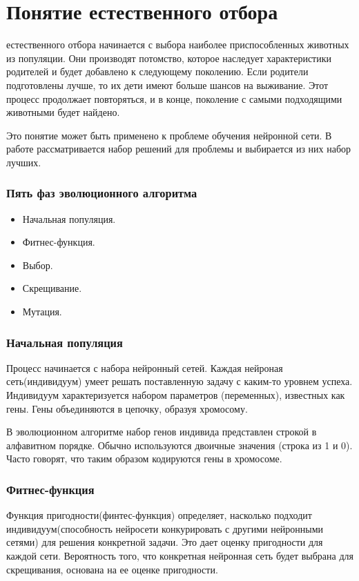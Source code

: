 \section{Понятие естественного отбора}

\indent {} естественного отбора начинается с выбора наиболее приспособленных животных из популяции. Они производят потомство, которое наследует характеристики родителей и будет добавлено к следующему поколению. Если родители подготовлены лучше, то их дети имеют больше шансов на выживание. Этот процесс продолжает повторяться, и в конце, поколение с самыми подходящими животными будет найдено.

Это понятие может быть применено к проблеме обучения нейронной сети. В работе рассматривается набор решений для проблемы и выбирается из них набор лучших.

\subsubsection{Пять фаз эволюционного алгоритма}
\begin{itemize}
  \item Начальная популяция.
  \item Фитнес-функция.
  \item Выбор.
  \item Скрещивание.
  \item Мутация.
\end{itemize}

\subsubsection{Начальная популяция}
\indent \indent Процесс начинается с набора нейронный сетей. Каждая нейроная сеть(индивидуум) умеет решать поставленную задачу с каким-то уровнем успеха.
Индивидуум характеризуется набором параметров (переменных), известных как гены. Гены объединяются в цепочку, образуя хромосому.

В эволюционном алгоритме набор генов индивида представлен строкой в алфавитном порядке. Обычно используются двоичные значения (строка из 1 и 0). Часто говорят, что таким образом кодируются гены в хромосоме.

\subsubsection{Фитнес-функция}
\indent \indent Функция пригодности(финтес-функция) определяет, насколько подходит индивидуум(способность нейросети конкурировать с другими нейронными сетями) для решения конкретной задачи. Это дает оценку пригодности для каждой сети. Вероятность того, что конкретная нейронная сеть будет выбрана для скрещивания, основана на ее оценке пригодности.

